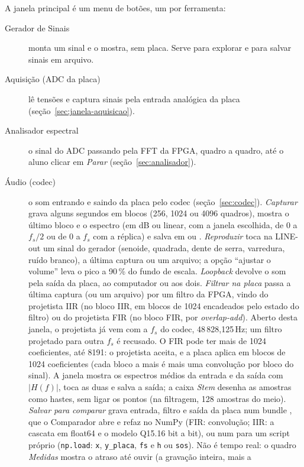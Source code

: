 A janela principal é um menu de botões, um por ferramenta:

\begin{description}
  \item[Gerador de Sinais] monta um sinal e o mostra, sem placa. Serve para
    explorar e para salvar sinais em arquivo.
  \item[Aquisição (ADC da placa)] lê tensões e captura sinais pela entrada
    analógica da placa (seção~\ref{sec:janela-aquisicao}).
  \item[Analisador espectral] o sinal do ADC passando pela FFT da FPGA, quadro
    a quadro, até o aluno clicar em \emph{Parar}
    (seção~\ref{sec:analisador}).
  \item[Áudio (codec)] o som entrando e saindo da placa pelo codec
    (seção~\ref{sec:codec}). \emph{Capturar} grava alguns segundos em blocos
    (256, 1024 ou 4096 quadros), mostra o último bloco e o espectro (em dB ou
    linear, com a janela escolhida, de 0 a \(f_s/2\) ou de 0 a \(f_s\) com a
    réplica) e salva em  ou .
    \emph{Reproduzir} toca na LINE-out um sinal do gerador (senoide, quadrada,
    dente de serra, varredura, ruído branco), a última captura ou um arquivo;
    a opção ``ajustar o volume'' leva o pico a 90\,\% do fundo de escala.
    \emph{Loopback} devolve o som pela saída da placa, ao computador ou aos
    dois. \emph{Filtrar na placa} passa a última captura (ou um arquivo) por
    um filtro da FPGA, vindo do projetista IIR (no bloco IIR, em blocos de
    1024 encadeados pelo estado do filtro) ou do projetista FIR (no bloco FIR, por
    \emph{overlap-add}). Aberto desta janela, o projetista já vem com a
    \(f_s\) do codec, 48\,828,125\,Hz; um filtro projetado para outra \(f_s\)
    é recusado. O FIR pode ter mais de 1024 coeficientes, até 8191: o
    projetista aceita, e a placa aplica em blocos de 1024 coeficientes (cada
    bloco a mais é mais uma convolução por bloco do sinal). A janela mostra os
    espectros médios da entrada e da saída com \(|H(f)|\), toca as duas e salva
    a saída; a caixa \emph{Stem} desenha as amostras como hastes, sem ligar os
    pontos (na filtragem, 128 amostras do meio). \emph{Salvar para comparar}
    grava entrada, filtro e saída da placa num bundle , que o
    Comparador abre e refaz no NumPy (FIR: convolução; IIR: a cascata em
    float64 e o modelo Q15.16 bit a bit), ou num  para um script
    próprio (\texttt{np.load}: \texttt{x}, \texttt{y\_placa}, \texttt{fs} e
    \texttt{h} ou \texttt{sos}). Não é tempo real: o quadro
    \emph{Medidas} mostra o atraso até ouvir (a gravação inteira, mais a

\end{description}
